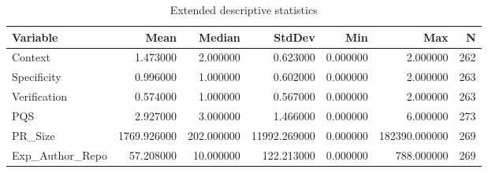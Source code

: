 \begin{table}
\caption{Extended descriptive statistics}
\label{tab:effect-sizes}
\begin{tabular}{lrrrrrr}
\toprule
Variable & Mean & Median & StdDev & Min & Max & N \\
\midrule
Context & 1.473000 & 2.000000 & 0.623000 & 0.000000 & 2.000000 & 262 \\
Specificity & 0.996000 & 1.000000 & 0.602000 & 0.000000 & 2.000000 & 263 \\
Verification & 0.574000 & 1.000000 & 0.567000 & 0.000000 & 2.000000 & 263 \\
PQS & 2.927000 & 3.000000 & 1.466000 & 0.000000 & 6.000000 & 273 \\
PR\_Size & 1769.926000 & 202.000000 & 11992.269000 & 0.000000 & 182390.000000 & 269 \\
Exp\_Author\_Repo & 57.208000 & 10.000000 & 122.213000 & 0.000000 & 788.000000 & 269 \\
\bottomrule
\end{tabular}
\end{table}
